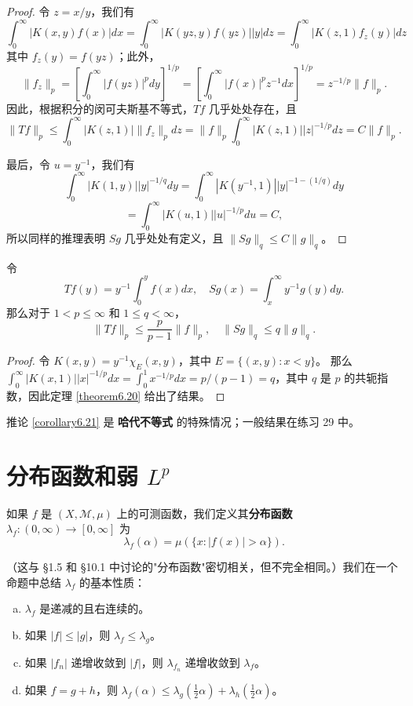 \documentclass[lang=cn,10pt,thmcnt=section]{elegantbook}
\begin{document}
\begin{proof}
令 $z = x/y$，我们有
\[ \int_0^\infty |K(x,y)f(x)| dx = \int_0^\infty |K(yz,y)f(yz)||y| dz = \int_0^\infty |K(z,1)f_z(y)| dz \]
其中 $f_z(y) = f(yz)$；此外，
\[ \|f_z\|_p = \left[ \int_0^\infty |f(yz)|^p dy \right]^{1/p} = \left[ \int_0^\infty |f(x)|^p z^{-1} dx \right]^{1/p} = z^{-1/p}\|f\|_p. \]
因此，根据积分的闵可夫斯基不等式，$Tf$ 几乎处处存在，且
\[ \|Tf\|_p \leq \int_0^\infty |K(z,1)| \|f_z\|_p dz = \|f\|_p \int_0^\infty |K(z,1)||z|^{-1/p} dz = C\|f\|_p. \]

最后，令 $u = y^{-1}$，我们有
\[ \int_0^\infty |K(1,y)||y|^{-1/q} dy = \int_0^\infty |K(y^{-1},1)||y|^{-1-(1/q)} dy \]
\[ = \int_0^\infty |K(u,1)||u|^{-1/p} du = C, \]
所以同样的推理表明 $Sg$ 几乎处处有定义，且 $\|Sg\|_q \leq C\|g\|_q$。
\end{proof}

\begin{corollary}\label{corollary6.21}
令
\[ Tf(y) = y^{-1} \int_0^y f(x) dx, \quad Sg(x) = \int_x^\infty y^{-1}g(y) dy. \]
那么对于 $1 < p \leq \infty$ 和 $1 \leq q < \infty$，
\[ \|Tf\|_p \leq \frac{p}{p-1}\|f\|_p, \quad \|Sg\|_q \leq q\|g\|_q. \]
\end{corollary}

\begin{proof}
令 $K(x,y) = y^{-1}\chi_E(x,y)$，其中 $E = \{(x,y) : x < y\}$。 那么 $\int_0^\infty |K(x,1)||x|^{-1/p} dx = \int_0^1 x^{-1/p} dx = p/(p-1) = q$，其中 $q$ 是 $p$ 的共轭指数，因此定理 \ref{theorem6.20} 给出了结果。
\end{proof}

推论 \ref{corollary6.21} 是 \textbf{哈代不等式} 的特殊情况；一般结果在练习 29 中。

\section{ 分布函数和弱 $L^p$}

如果 $f$ 是 $(X, \mathcal{M}, \mu)$ 上的可测函数，我们定义其\textbf{分布函数} $\lambda_f : (0, \infty) \to [0, \infty]$ 为
\[ \lambda_f(\alpha) = \mu(\{x : |f(x)| > \alpha\}). \]

（这与 §1.5 和 §10.1 中讨论的"分布函数"密切相关，但不完全相同。）我们在一个命题中总结 $\lambda_f$ 的基本性质：

\begin{proposition}\label{proposition6.22}
\begin{enumerate}[a.]
\item $\lambda_f$ 是递减的且右连续的。
\item 如果 $|f| \leq |g|$，则 $\lambda_f \leq \lambda_g$。
\item 如果 $|f_n|$ 递增收敛到 $|f|$，则 $\lambda_{f_n}$ 递增收敛到 $\lambda_f$。
\item 如果 $f = g + h$，则 $\lambda_f(\alpha) \leq \lambda_g(\frac{1}{2}\alpha) + \lambda_h(\frac{1}{2}\alpha)$。
\end{enumerate}
\end{proposition}
\end{document}
